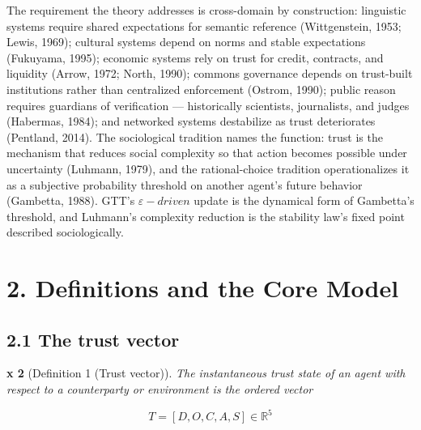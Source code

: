 \documentclass[
]{article}
\begin{document}
The requirement the theory addresses is cross-domain by construction:
linguistic systems require shared expectations for semantic reference
(Wittgenstein, 1953; Lewis, 1969); cultural systems depend on norms and
stable expectations (Fukuyama, 1995); economic systems rely on trust for
credit, contracts, and liquidity (Arrow, 1972; North, 1990); commons
governance depends on trust-built institutions rather than centralized
enforcement (Ostrom, 1990); public reason requires guardians of
verification --- historically scientists, journalists, and judges
(Habermas, 1984); and networked systems destabilize as trust
deteriorates (Pentland, 2014). The sociological tradition names the
function: trust is the mechanism that reduces social complexity so that
action becomes possible under uncertainty (Luhmann, 1979), and the
rational-choice tradition operationalizes it as a subjective probability
threshold on another agent's future behavior (Gambetta, 1988). GTT's
\(\varepsilon-driven\) update is the dynamical form of Gambetta's
threshold, and Luhmann's complexity reduction is the stability law's
fixed point described sociologically.

\section{2. Definitions and the Core
Model}\label{definitions-and-the-core-model}

\subsection{2.1 The trust vector}\label{the-trust-vector}

\textbf{x 2} (Definition 1 (Trust vector)). \emph{The instantaneous
trust state of an agent with respect to a counterparty or environment is
the ordered vector}

\begin{equation}
T = [D, O, C, A, S] \in \mathbb{R}^{5}
\label{eq:trustvec}
\end{equation}
\end{document}
